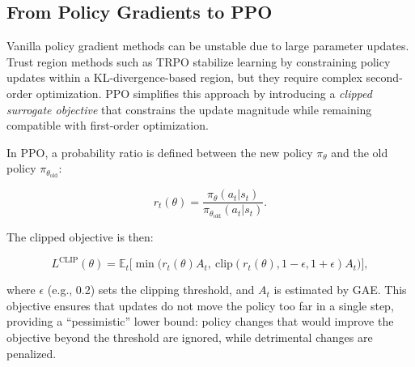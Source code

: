 \subsection{From Policy Gradients to PPO}

\justify Vanilla policy gradient methods can be unstable due to large parameter updates. Trust region methods such as TRPO stabilize learning by constraining policy updates within a KL-divergence-based region, but they require complex second-order optimization. PPO simplifies this approach by introducing a \emph{clipped surrogate objective} that constrains the update magnitude while remaining compatible with first-order optimization.  

\justify In PPO, a probability ratio is defined between the new policy $\pi_\theta$ and the old policy $\pi_{\theta_\text{old}}$:

\begin{equation}
r_t(\theta) = \frac{\pi_\theta(a_t|s_t)}{\pi_{\theta_\text{old}}(a_t|s_t)}.
\end{equation}

The clipped objective is then:

\begin{equation}
L^\text{CLIP}(\theta) = \mathbb{E}_t \Big[ \min \big( r_t(\theta) A_t, \ \text{clip}(r_t(\theta), 1-\epsilon, 1+\epsilon) A_t \big) \Big],
\end{equation}

where $\epsilon$ (e.g., 0.2) sets the clipping threshold, and \(A_t\) is estimated by GAE. This objective ensures that updates do not move the policy too far in a single step, providing a “pessimistic” lower bound: policy changes that would improve the objective beyond the threshold are ignored, while detrimental changes are penalized.



